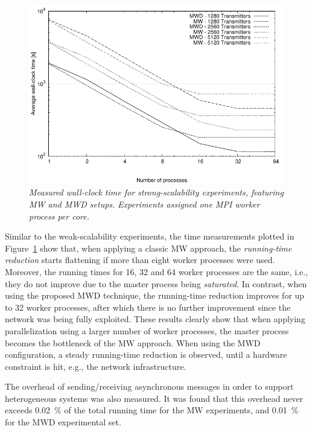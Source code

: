 \begin{figure}
\centering

\includegraphics[width=0.8\columnwidth]{04-framework_design_and_implementation/img/strong_scaling-time_plot}

\caption{\textit{\emph{Measured wall-clock time for strong-scalability experiments,
featuring MW and MWD setups.}}\textit{ }\textit{\emph{Experiments
assigned one MPI worker process per core. \label{fig:04-Strong_scalability_time}}}}
\end{figure}


Similar to the weak-scalability experiments, the time measurements
plotted in Figure~\ref{fig:04-Strong_scalability_time} show that,
when applying a classic MW approach, the \textit{\emph{running-time
reduction}} starts flattening if more than eight worker processes
were used. Moreover, the running times for 16, 32 and 64 worker processes
are the same, i.e., they do not improve due to the master process
being \textit{\emph{saturated}}. In contrast, when using the proposed
MWD technique, the running-time reduction improves for up to 32 worker
processes, after which there is no further improvement since the network
was being fully exploited. These results clearly show that when applying
parallelization using a larger number of worker processes, the master
process becomes the bottleneck of the MW approach. When using the
MWD configuration, a steady running-time reduction is observed, until
a hardware constraint is hit, e.g., the network infrastructure.

The overhead of sending/receiving asynchronous messages in order to
support heterogeneous systems was also measured. It was found that
this overhead never exceeds 0.02~\% of the total running time for
the MW experiments, and 0.01~\% for the MWD experimental set.


